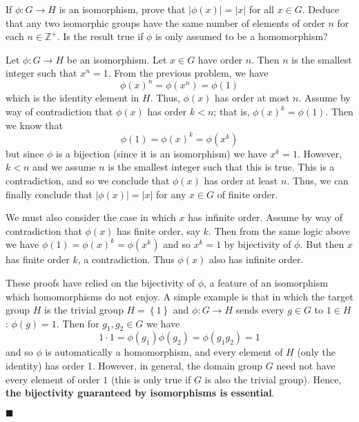 \documentclass[12pt]{article}
\renewcommand{\qed}{\hfill$\blacksquare$}
\renewenvironment{proof}{\begin{addmargin}[1em]{0em}\begin{newproof}}{\end{newproof}\end{addmargin}\qed}
\newenvironment{problem}[2][Exercise]{\begin{trivlist}
\item[\hskip \labelsep {\bfseries #1}\hskip \labelsep {\bfseries #2.}]}{\end{trivlist}}
\begin{document}
\begin{problem}{1.6.2}
If $\phi:G\rightarrow H$ is an isomorphism, prove that $\left|\phi\left(x\right)\right|=\left|x\right|$ for all $x\in G$. Deduce that any two isomorphic groups have the same number of elements of order $n$ for each $n\in \mathbb{Z}^+$. Is the result true if $\phi$ is only assumed to be a homomorphism?
\end{problem}
\begin{proof}
Let $\phi:G\rightarrow H$ be an isomorphism. Let $x\in G$ have order $n$. Then $n$ is the smallest integer such that $x^n=1$. From the previous problem, we have $$\phi\left(x\right)^n = \phi\left(x^n\right)=\phi\left(1\right)$$ which is the identity element in $H$. Thus, $\phi\left(x\right)$ has order at most $n$. Assume by way of contradiction that $\phi\left(x\right)$ has order $k<n$; that is, $\phi\left(x\right)^k = \phi\left(1\right)$. Then we know that
\begin{equation*}
        \phi\left(1\right)  = \phi\left(x\right)^k = \phi\left(x^k\right)
\end{equation*}
but since $\phi$ is a bijection (since it is an isomorphism) we have $x^k=1$. However, $k<n$ and we assume $n$ is the smallest integer such that this is true. This is a contradiction, and so we conclude that $\phi\left(x\right)$ has order at least $n$. Thus, we can finally conclude that $\left|\phi\left(x\right)\right|=\left|x\right|$ for any $x\in G$ of finite order.

We must also consider the case in which $x$ has infinite order. Assume by way of contradiction that $\phi\left(x\right)$ has finite order, say $k$. Then from the same logic above we have $\phi\left(1\right)=\phi\left(x\right)^k=\phi\left(x^k\right)$ and so $x^k=1$ by bijectivity of $\phi$. But then $x$ has finite order $k$, a contradiction. Thus $\phi\left(x\right)$ also has infinite order.

These proofs have relied on the bijectivity of $\phi$, a feature of an isomorphism which homomorphisms do not enjoy. A simple example is that in which the target group $H$ is the trivial group $H=\left\{1\right\}$ and $\phi:G\rightarrow H$ sends every $g\in G$ to $1\in H$: $\phi\left(g\right)=1$. Then for $g_1,g_2\in G$ we have
$$ 1\cdot 1 = \phi\left(g_1\right)\phi\left(g_2\right) = \phi\left(g_1g_2\right) = 1 $$ and so $\phi$ is automatically a homomorphism, and every element of $H$ (only the identity) has order 1. However, in general, the domain group $G$ need not have every element of order $1$ (this is only true if $G$ is also the trivial group). Hence, \textbf{the bijectivity guaranteed by isomorphisms is essential}.
\end{proof}
\end{document}
